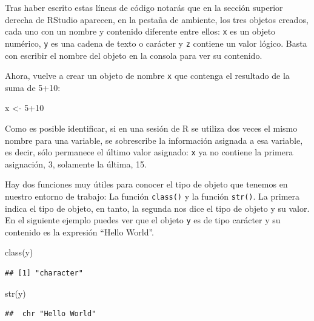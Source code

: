 \documentclass[
  11pt,
  oneside]{book}
\newenvironment{Shaded}{\begin{snugshade}}{\end{snugshade}}
\newcommand{\DecValTok}[1]{\textcolor[rgb]{0.00,0.00,0.81}{#1}}
\newcommand{\FunctionTok}[1]{\textcolor[rgb]{0.00,0.00,0.00}{#1}}
\newcommand{\NormalTok}[1]{#1}
\newcommand{\OtherTok}[1]{\textcolor[rgb]{0.56,0.35,0.01}{#1}}
\newcommand{\SpecialCharTok}[1]{\textcolor[rgb]{0.00,0.00,0.00}{#1}}
\begin{document}
Tras haber escrito estas líneas de código notarás que en la sección superior derecha de RStudio aparecen, en la pestaña de ambiente, los tres objetos creados, cada uno con un nombre y contenido diferente entre ellos: \texttt{x} es un objeto numérico, \texttt{y} es una cadena de texto o carácter y \texttt{z} contiene un valor lógico. Basta con escribir el nombre del objeto en la consola para ver su contenido.

Ahora, vuelve a crear un objeto de nombre \texttt{x} que contenga el resultado de la suma de 5+10:

\begin{Shaded}
\begin{Highlighting}[]
\NormalTok{x }\OtherTok{\textless{}{-}} \DecValTok{5}\SpecialCharTok{+}\DecValTok{10}
\end{Highlighting}
\end{Shaded}

Como es posible identificar, si en una sesión de R se utiliza dos veces el mismo nombre para una variable, se sobrescribe la información asignada a esa variable, es decir, sólo permanece el último valor asignado: \texttt{x} ya no contiene la primera asignación, 3, solamente la última, 15.

Hay dos funciones muy útiles para conocer el tipo de objeto que tenemos en nuestro entorno de trabajo: La función \texttt{class()} y la función \texttt{str()}. La primera indica el tipo de objeto, en tanto, la segunda nos dice el tipo de objeto y su valor. En el siguiente ejemplo puedes ver que el objeto \texttt{y} es de tipo carácter y su contenido es la expresión ``Hello World''.

\begin{Shaded}
\begin{Highlighting}[]
\FunctionTok{class}\NormalTok{(y)}
\end{Highlighting}
\end{Shaded}

\begin{verbatim}
## [1] "character"
\end{verbatim}

\begin{Shaded}
\begin{Highlighting}[]
\FunctionTok{str}\NormalTok{(y)}
\end{Highlighting}
\end{Shaded}

\begin{verbatim}
##  chr "Hello World"
\end{verbatim}
\end{document}
